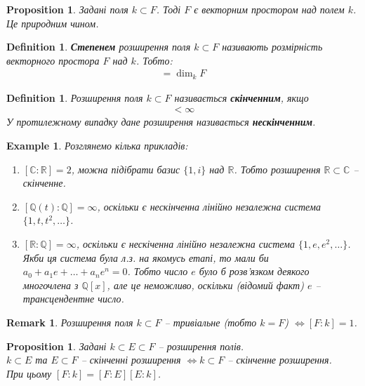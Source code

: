 \documentclass[a4paper, 10pt]{article}
\theoremstyle{theoremdd}
\theoremstyle{theoremdd}
\newtheorem{definition}[theorem]{Definition}
\theoremstyle{theoremdd}
\theoremstyle{theoremdd}
\theoremstyle{theoremdd}
\newtheorem{example}[theorem]{Example}
\theoremstyle{theoremdd}
\theoremstyle{theoremdd}
\theoremstyle{theoremdd}
\theoremstyle{theoremdd}
\newtheorem{proposition}[theorem]{Proposition}
\theoremstyle{theoremdd}
\theoremstyle{theoremdd}
\newtheorem{remark}[theorem]{Remark}
\theoremstyle{theoremdd}
\theoremstyle{theoremdd}
\theoremstyle{theoremdd}
\theoremstyle{theoremdd}
\begin{document}
\begin{proposition}
Задані поля $k \subset F$. Тоді $F$ є векторним простором над полем $k$.\\
\textit{Це природним чином.}
\end{proposition}

\begin{definition}
\textbf{Степенем} розширення поля $k \subset F$ називають розмірність векторного простора $F$ над $k$. Тобто:
\begin{align*}
[F : k] = \dim_k F
\end{align*}
\end{definition}

\begin{definition}
Розширення поля $k \subset F$ називається \textbf{скінченним}, якщо
\begin{align*}
[F:K] < \infty
\end{align*}
У протилежному випадку дане розширення називається \textbf{нескінченним}.
\end{definition}

\begin{example}
Розглянемо кілька прикладів:
\begin{enumerate}[nosep,wide=0pt,label={\arabic*)}]
\item $[\mathbb{C} : \mathbb{R}] = 2$, можна підібрати базис $\{1,i\}$ над $\mathbb{R}$. Тобто розширення $\mathbb{R} \subset \mathbb{C}$ -- скінченне.
\item $[\mathbb{Q}(t) : \mathbb{Q}] = \infty$, оскільки є нескінченна лінійно незалежна система $\{1,t,t^2,\dots\}$.
\item $[\mathbb{R} : \mathbb{Q}] = \infty$, оскільки є нескіченна лінійно незалежна система $\{1,e,e^2,\dots\}$. Якби ця система була л.з. на якомусь етапі, то мали би $a_0 + a_1 e + \dots + a_n e^n = 0$. Тобто число $e$ було б розв'язком деякого многочлена з $\mathbb{Q}[x]$, але це неможливо, оскільки (відомий факт) $e$ -- трансцендентне число.
\end{enumerate}
\end{example}

\begin{remark}
Розширення поля $k \subset F$ -- тривіальне (тобто $k = F$) $\iff [F:k] = 1$.
\end{remark}

\begin{proposition}
Задані $k \subset E \subset F$ -- розширення полів. \\
$k \subset E$ та $E \subset F$ -- скінченні розширення $\iff k \subset F$ -- скінченне розширення. \\
При цьому $[F:k] = [F:E][E:k]$.
\end{proposition}
\end{document}
